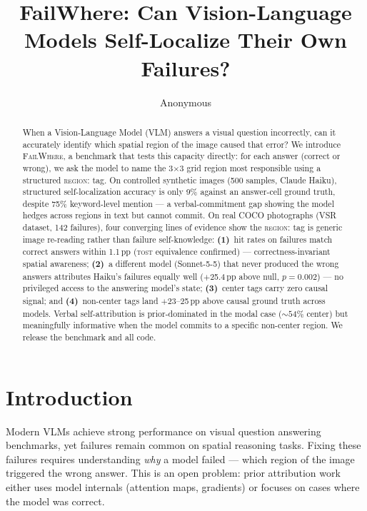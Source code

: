 \documentclass[11pt]{article}
\title{FailWhere: Can Vision-Language Models Self-Localize Their Own Failures?}
\author{Anonymous}
\begin{document}
\maketitle

\begin{abstract}
When a Vision-Language Model (VLM) answers a visual question incorrectly, can it
accurately identify which spatial region of the image caused that error?
We introduce \textsc{FailWhere}, a benchmark that tests this capacity directly:
for each answer (correct or wrong), we ask the model to name the 3$\times$3 grid
region most responsible using a structured \textsc{region:} tag.
On controlled synthetic images (500 samples, Claude Haiku), structured
self-localization accuracy is only 9\% against an answer-cell ground truth,
despite 75\% keyword-level mention — a verbal-commitment gap showing the model
hedges across regions in text but cannot commit.
On real COCO photographs (VSR dataset, 142 failures), four converging lines of
evidence show the \textsc{region:} tag is generic image re-reading rather than
failure self-knowledge:
\textbf{(1)}~hit rates on failures match correct answers within 1.1\,pp
(\textsc{tost} equivalence confirmed) — correctness-invariant spatial awareness;
\textbf{(2)}~a different model (Sonnet-5-5) that never produced the wrong answers
attributes Haiku's failures equally well ($+$25.4\,pp above null, $p{=}0.002$) —
no privileged access to the answering model's state;
\textbf{(3)}~center tags carry zero causal signal; and
\textbf{(4)}~non-center tags land $+$23--25\,pp above causal ground truth across
models.
Verbal self-attribution is prior-dominated in the modal case (${\sim}54\%$ center)
but meaningfully informative when the model commits to a specific non-center region.
We release the benchmark and all code.
\end{abstract}


\section{Introduction}

Modern VLMs achieve strong performance on visual question answering benchmarks,
yet failures remain common on spatial reasoning tasks.
Fixing these failures requires understanding \emph{why} a model failed —
which region of the image triggered the wrong answer.
This is an open problem: prior attribution work either uses model internals
(attention maps, gradients) or focuses on cases where the model was correct.
\end{document}
